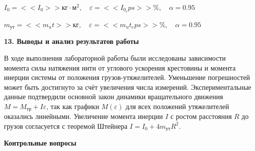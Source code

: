 \documentclass[14pt]{extreport}
\begin{document}
\centerline{$I_0 = <<I_0>> \text{кг} \cdot \text{м}^2, \quad \varepsilon = <<I_0_eps>> \%, \quad \alpha = 0.95$}

\centerline{$m_\text{ут} = <<m_ut>> \text{кг}, \quad \varepsilon = <<m_ut_eps>> \%, \quad \alpha = 0.95$}

\noindent\textbf{13. Выводы и анализ результатов работы}

В ходе выполнения лабораторной работы были исследованы зависимости момента силы натяжения нити от углового ускорения крестовины и момента инерции системы от положения грузов-утяжелителей. Уменьшение погрешностей может быть достигнуто за счёт увеличения числа измерений. Экспериментальные данные подтвердили основной закон динамики вращательного движения $M = M_\text{тр} + I \varepsilon$, так как графики $M(\varepsilon)$ для всех положений утяжелителей оказались линейными. Увеличение момента инерции $I$ с ростом расстояния $R$ до грузов согласуется с теоремой Штейнера $I = I_0 + 4 m_\text{ут} R^2$. 

\newpage
\textbf{Контрольные вопросы}
\end{document}
